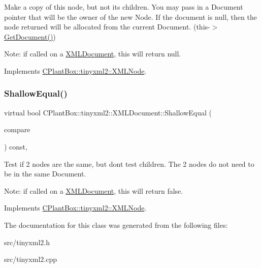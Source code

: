Make a copy of this node, but not its children. You may pass in a Document pointer that will be the owner of the new Node. If the \textquotesingle{}document\textquotesingle{} is null, then the node returned will be allocated from the current Document. (this-\/$>$\hyperlink{classCPlantBox_1_1tinyxml2_1_1XMLNode_ac0d1a9be320497a51e7a202881a2352e}{Get\+Document()})

Note\+: if called on a \hyperlink{classCPlantBox_1_1tinyxml2_1_1XMLDocument}{X\+M\+L\+Document}, this will return null. 

Implements \hyperlink{classCPlantBox_1_1tinyxml2_1_1XMLNode_a8439e4e87206b26bc03427ffac3e882a}{C\+Plant\+Box\+::tinyxml2\+::\+X\+M\+L\+Node}.

\mbox{\label{classCPlantBox_1_1tinyxml2_1_1XMLDocument_a652692e95a36891e41b2a18eef3eda1b}} 
\subsubsection{\texorpdfstring{Shallow\+Equal()}{ShallowEqual()}}
{\footnotesize\ttfamily virtual bool C\+Plant\+Box\+::tinyxml2\+::\+X\+M\+L\+Document\+::\+Shallow\+Equal (\begin{DoxyParamCaption}\item[{const \hyperlink{classCPlantBox_1_1tinyxml2_1_1XMLNode}{X\+M\+L\+Node} $\ast$}]{compare }\end{DoxyParamCaption}) const\hspace{0.3cm}{\ttfamily [inline]}, {\ttfamily [virtual]}}

Test if 2 nodes are the same, but don\textquotesingle{}t test children. The 2 nodes do not need to be in the same Document.

Note\+: if called on a \hyperlink{classCPlantBox_1_1tinyxml2_1_1XMLDocument}{X\+M\+L\+Document}, this will return false. 

Implements \hyperlink{classCPlantBox_1_1tinyxml2_1_1XMLNode_a1019a06dab15152f06f3a879bf9a85c9}{C\+Plant\+Box\+::tinyxml2\+::\+X\+M\+L\+Node}.



The documentation for this class was generated from the following files\+:\begin{DoxyCompactItemize}
\item 
src/tinyxml2.\+h\item 
src/tinyxml2.\+cpp\end{DoxyCompactItemize}
